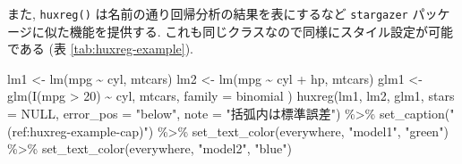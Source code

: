 \documentclass[
]{bxjsbook}
\newenvironment{Shaded}{\begin{snugshade}}{\end{snugshade}}
\newcommand{\AttributeTok}[1]{\textcolor[rgb]{0.77,0.63,0.00}{#1}}
\newcommand{\ConstantTok}[1]{\textcolor[rgb]{0.00,0.00,0.00}{#1}}
\newcommand{\DecValTok}[1]{\textcolor[rgb]{0.00,0.00,0.81}{#1}}
\newcommand{\FunctionTok}[1]{\textcolor[rgb]{0.00,0.00,0.00}{#1}}
\newcommand{\NormalTok}[1]{#1}
\newcommand{\OtherTok}[1]{\textcolor[rgb]{0.56,0.35,0.01}{#1}}
\newcommand{\SpecialCharTok}[1]{\textcolor[rgb]{0.00,0.00,0.00}{#1}}
\newcommand{\StringTok}[1]{\textcolor[rgb]{0.31,0.60,0.02}{#1}}
\theoremstyle{definition}
\theoremstyle{definition}
\theoremstyle{definition}
\theoremstyle{remark}
\begin{document}
また, \texttt{huxreg()} は名前の通り回帰分析の結果を表にするなど
\texttt{stargazer} パッケージに似た機能を提供する.
これも同じクラスなので同様にスタイル設定が可能である (表
\ref{tab:huxreg-example}).



\begin{Shaded}
\begin{Highlighting}[numbers=left,,]
\NormalTok{lm1 }\OtherTok{\textless{}{-}} \FunctionTok{lm}\NormalTok{(mpg }\SpecialCharTok{\textasciitilde{}}\NormalTok{ cyl, mtcars)}
\NormalTok{lm2 }\OtherTok{\textless{}{-}} \FunctionTok{lm}\NormalTok{(mpg }\SpecialCharTok{\textasciitilde{}}\NormalTok{ cyl }\SpecialCharTok{+}\NormalTok{ hp, mtcars)}
\NormalTok{glm1 }\OtherTok{\textless{}{-}} \FunctionTok{glm}\NormalTok{(}\FunctionTok{I}\NormalTok{(mpg }\SpecialCharTok{\textgreater{}} \DecValTok{20}\NormalTok{) }\SpecialCharTok{\textasciitilde{}}\NormalTok{ cyl, mtcars,}
  \AttributeTok{family =}\NormalTok{ binomial}
\NormalTok{)}
\FunctionTok{huxreg}\NormalTok{(lm1, lm2, glm1, }\AttributeTok{stars =} \ConstantTok{NULL}\NormalTok{, }\AttributeTok{error\_pos =} \StringTok{"below"}\NormalTok{, }\AttributeTok{note =} \StringTok{"括弧内は標準誤差"}\NormalTok{) }\SpecialCharTok{\%\textgreater{}\%}
  \FunctionTok{set\_caption}\NormalTok{(}\StringTok{"(ref:huxreg{-}example{-}cap)"}\NormalTok{) }\SpecialCharTok{\%\textgreater{}\%}
  \FunctionTok{set\_text\_color}\NormalTok{(everywhere, }\StringTok{"model1"}\NormalTok{, }\StringTok{"green"}\NormalTok{) }\SpecialCharTok{\%\textgreater{}\%}
  \FunctionTok{set\_text\_color}\NormalTok{(everywhere, }\StringTok{"model2"}\NormalTok{, }\StringTok{"blue"}\NormalTok{)}
\end{Highlighting}
\end{Shaded}

 
  \providecommand{\huxb}[2]{\arrayrulecolor[RGB]{#1}\global\arrayrulewidth=#2pt}
  \providecommand{\huxvb}[2]{\color[RGB]{#1}\vrule width #2pt}
  \providecommand{\huxtpad}[1]{\rule{0pt}{#1}}
  \providecommand{\huxbpad}[1]{\rule[-#1]{0pt}{#1}}
\end{document}
